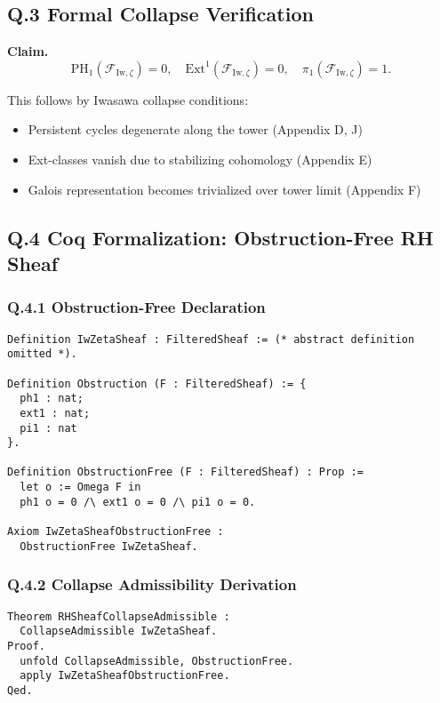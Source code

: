 \documentclass[11pt]{article}
\begin{document}
\subsection*{Q.3 Formal Collapse Verification}

\textbf{Claim.}  
\[
\mathrm{PH}_1(\mathcal{F}_{\mathrm{Iw},\zeta}) = 0,\quad
\mathrm{Ext}^1(\mathcal{F}_{\mathrm{Iw},\zeta}) = 0,\quad
\pi_1(\mathcal{F}_{\mathrm{Iw},\zeta}) = 1.
\]

This follows by Iwasawa collapse conditions:

\begin{itemize}
  \item Persistent cycles degenerate along the tower (Appendix D, J)
  \item Ext-classes vanish due to stabilizing cohomology (Appendix E)
  \item Galois representation becomes trivialized over tower limit (Appendix F)
\end{itemize}

\subsection*{Q.4 Coq Formalization: Obstruction-Free RH Sheaf}

\subsubsection*{Q.4.1 Obstruction-Free Declaration}

\begin{lstlisting}[language=Coq, caption=Obstruction-Free RH Collapse Verification, captionpos=b]
Definition IwZetaSheaf : FilteredSheaf := (* abstract definition omitted *).

Definition Obstruction (F : FilteredSheaf) := {
  ph1 : nat;
  ext1 : nat;
  pi1 : nat
}.

Definition ObstructionFree (F : FilteredSheaf) : Prop :=
  let o := Omega F in
  ph1 o = 0 /\ ext1 o = 0 /\ pi1 o = 0.

Axiom IwZetaSheafObstructionFree :
  ObstructionFree IwZetaSheaf.
\end{lstlisting}

\subsubsection*{Q.4.2 Collapse Admissibility Derivation}

\begin{lstlisting}[language=Coq, caption=Collapse Admissibility from Obstruction Freedom, captionpos=b]
Theorem RHSheafCollapseAdmissible :
  CollapseAdmissible IwZetaSheaf.
Proof.
  unfold CollapseAdmissible, ObstructionFree.
  apply IwZetaSheafObstructionFree.
Qed.
\end{lstlisting}
\end{document}
